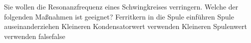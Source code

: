     {Sie wollen die Resonanzfrequenz eines Schwingkreises verringern. Welche der folgenden Maßnahmen ist geeignet?}
    {Ferritkern in die Spule einführen}
    {Spule auseinanderziehen}
    {Kleineren Kondensatorwert verwenden}
    {Kleineren Spulenwert verwenden}
    {false}{false}
